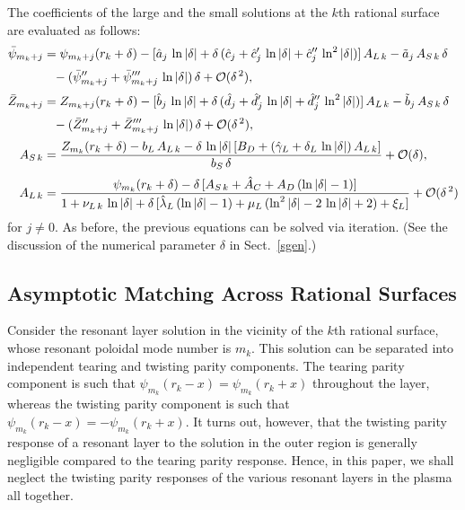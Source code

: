 \documentclass[12pt,prb,aps]{revtex4-1}
\begin{document}
The coefficients of the large and the small solutions at the $k$th rational surface are evaluated as follows:
\begin{align}
\bar{\psi}_{m_k+j} &= \psi_{m_k+j}(r_k+\delta)- [\hat{a}_j\,\ln|\delta|+ \delta\,(\hat{c}_j+\hat{c}_j'\,\ln|\delta|+\hat{c}_j''\,\ln^2|\delta|)]\,A_{L\,k}
-\tilde{a}_j\,A_{S\,k}\,\delta \nonumber\\[0.5ex]
&\phantom{=}- (\bar{\psi}_{m_k+j}''+\bar{\psi}_{m_k+j}'''\,\ln|\delta|)\,\delta +{\cal O}(\delta^{\,2}),\\[0.5ex]
\bar{Z}_{m_k+j}&= Z_{m_k+j}(r_k+\delta)- [\hat{b}_j\,\ln|\delta|+ \delta\,(\hat{d}_j+\hat{d}_j'\,\ln|\delta|+\hat{d}_j''\,\ln^2|\delta|)]\,A_{L\,k}
-\tilde{b}_j\,A_{S\,k}\,\delta \nonumber\\[0.5ex]
&\phantom{=}- (\bar{Z}_{m_k+j}''+\bar{Z}_{m_k+j}'''\,\ln|\delta|)\,\delta +{\cal O}(\delta^{\,2}),\\[0.5ex]
A_{S\,k} &= \frac{Z_{m_k}(r_k+\delta)-b_{L}\,A_{L\,k}-\delta\,\ln|\delta|\,[B_D+(\hat{\gamma}_L+\delta_L\,\ln|\delta|)\,A_{L\,k}]}
{b_S\,\delta}+{\cal O}(\delta),\\[0.5ex]
A_{L\,k} &= \frac{\psi_{m_k}(r_k+\delta)-\delta\,[A_{S\,k}+\hat{A}_C+A_D\,(\ln|\delta|-1)]}
{1+\nu_{L\,k}\,\ln|\delta|+\delta\,[\hat{\lambda}_L\,(\ln|\delta|-1)+ \mu_L\,(\ln^2|\delta|-2\,\ln|\delta|+2)+\xi_L]}+{\cal O}(\delta^{\,2})
\end{align}
for $j\neq 0$. As before, the previous equations can be solved via iteration. (See the discussion of the numerical parameter $\delta$ in
Sect.~\ref{sgen}.)

\subsection{Asymptotic Matching Across  Rational Surfaces}\label{sa7}
Consider the resonant layer solution in the vicinity of the $k$th  rational surface, whose resonant poloidal mode number is $m_k$. 
This solution can be separated into independent tearing and twisting parity components.\cite{ggj}
The tearing parity   component is such that $\psi_{m_k}(r_k-x)=\psi_{m_k}(r_k+x)$ throughout the layer, whereas the  twisting parity component is such that
$\psi_{m_k}(r_k-x)=-\psi_{m_k}(r_k+x)$. It turns out, however, that the twisting parity response of a resonant layer to the solution in the outer region is generally negligible compared to the tearing parity response.\cite{connor,twist,am3}
Hence,  in this paper, we shall neglect the twisting parity responses of the various resonant layers  in the plasma all together. 
\end{document}
